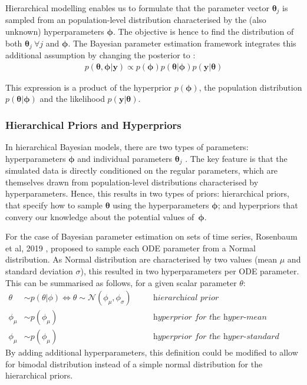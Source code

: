 \documentclass[11pt]{article}
\begin{document}
Hierarchical modelling enables us to formulate that the parameter vector $\boldsymbol{\theta}_j$ is sampled from an population-level distribution characterised by the (also unknown) hyperparameters $\boldsymbol{\phi}$. The objective is hence to find the distribution of both $\boldsymbol{\theta}_j~\forall j$ and $\boldsymbol{\phi}$. The Bayesian parameter estimation framework integrates this additional assumption by changing the posterior to \cite{tbk_gelman}:
\begin{align*}
    p(\boldsymbol{\theta}, \boldsymbol{\phi} | \boldsymbol{y}) \propto p(\boldsymbol{\phi})p(\boldsymbol{\theta}|\boldsymbol{\phi})p(\boldsymbol{y}|\boldsymbol{\theta})
\end{align*} 

This expression is a product of the hyperprior $p(\boldsymbol{\phi})$, the population distribution $p(\boldsymbol{\theta}|\boldsymbol{\phi})$ and the likelihood $p(\boldsymbol{y}|\boldsymbol{\theta})$.

\subsubsection{Hierarchical Priors and Hyperpriors}
In hierarchical Bayesian models, there are two types of parameters: hyperparameters $\boldsymbol{\phi}$ and individual parameters $\boldsymbol{\theta}_j$ \cite{tbk_gelman}. The key feature is that the simulated data is directly conditioned on the regular parameters, which are themselves drawn from population-level distributions characterised by hyperparameters. Hence, this results in two types of priors: hierarchical priors, that specify how to sample $\boldsymbol{\theta}$ using the hyperparameters $\boldsymbol{\phi}$; and hyperpriors that convery our knowledge about the potential values of~$\boldsymbol{\phi}$.

For the case of Bayesian parameter estimation on sets of time series, Rosenbaum et al, 2019 \cite{rosenbaum}, proposed to sample each ODE parameter from a Normal distribution. As Normal distribution are characterised by two values (mean $\mu$ and standard deviation $\sigma$), this resulted in two hyperparameters per ODE parameter. This can be summarised as follows, for a given scalar parameter $\theta$:
\begin{align*}
    \theta &\sim p(\theta | \phi) \Leftrightarrow \theta \sim \mathcal{N}(\phi_\mu, \phi_\sigma) \quad &&\textit{hierarchical prior} \\ 
    \phi_\mu &\sim p(\phi_\mu) \quad &&\textit{hyperprior for the hyper-mean} \\ 
    \phi_\mu &\sim p(\phi_\mu) \quad &&\textit{hyperprior for the hyper-standard deviation} 
\end{align*}
By adding additional hyperparameters, this definition could be modified to allow for bimodal distribution instead of a simple normal distribution for the hierarchical priors.
\end{document}
